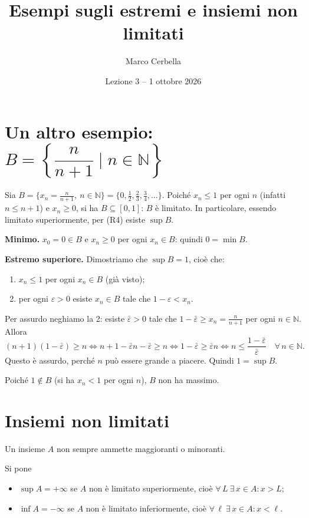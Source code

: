 \documentclass[11pt,a4paper]{article}
\title{Esempi sugli estremi e insiemi non limitati}
\author{Marco Cerbella}
\date{Lezione 3 -- 1 ottobre 2026}
\begin{document}
\maketitle

\section{Un altro esempio: $B = \left\{ \dfrac{n}{n+1} \mid n \in \mathbb{N} \right\}$}

\begin{esempio}
Sia $B = \{x_n = \frac{n}{n+1},\ n \in \mathbb{N}\} = \{0, \frac12, \frac23, \frac34, \dots\}$. Poiché $x_n \leq 1$ per ogni $n$ (infatti $n \leq n + 1$) e $x_n \geq 0$, si ha $B \subseteq [0, 1]$: $B$ è limitato. In particolare, essendo limitato superiormente, per (R4) esiste $\sup B$.

\textbf{Minimo.} $x_0 = 0 \in B$ e $x_n \geq 0$ per ogni $x_n \in B$: quindi $0 = \min B$.

\textbf{Estremo superiore.} Dimostriamo che $\sup B = 1$, cioè che:
\begin{enumerate}
    \item $x_n \leq 1$ per ogni $x_n \in B$ (già visto);
    \item per ogni $\varepsilon > 0$ esiste $x_n \in B$ tale che $1 - \varepsilon < x_n$.
\end{enumerate}
Per assurdo neghiamo la 2: esiste $\bar\varepsilon > 0$ tale che $1 - \bar\varepsilon \geq x_n = \frac{n}{n+1}$ per ogni $n \in \mathbb{N}$. Allora
\[
(n+1)(1 - \bar\varepsilon) \geq n \iff n + 1 - \bar\varepsilon n - \bar\varepsilon \geq n
\iff 1 - \bar\varepsilon \geq \bar\varepsilon n
\iff n \leq \frac{1 - \bar\varepsilon}{\bar\varepsilon} \quad \forall\, n \in \mathbb{N}.
\]
Questo è assurdo, perché $n$ può essere grande a piacere. Quindi $1 = \sup B$.

Poiché $1 \notin B$ (si ha $x_n < 1$ per ogni $n$), $B$ non ha massimo.
\end{esempio}

\section{Insiemi non limitati}

Un insieme $A$ non sempre ammette maggioranti o minoranti.

\begin{definizione}
Si pone
\begin{itemize}
    \item $\sup A = +\infty$ se $A$ non è limitato superiormente, cioè
          $\forall\, L \ \exists\, x \in A : x > L$;
    \item $\inf A = -\infty$ se $A$ non è limitato inferiormente, cioè
          $\forall\, \ell \ \exists\, x \in A : x < \ell$.
\end{itemize}
\end{definizione}
\end{document}
